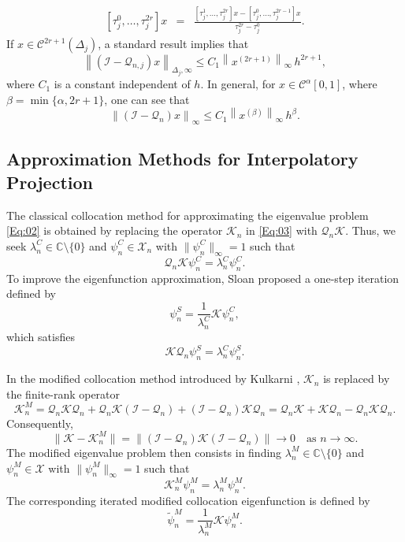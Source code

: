 \documentclass[]{interact}
\theoremstyle{plain}%
\theoremstyle{definition}
\theoremstyle{remark}
\newcommand{\norm}[1]{\left\lVert #1\right\rVert}
\begin{document}
\begin{eqnarray*}
	\left[\tau_j^0, \ldots, \tau_j^{2r}\right]x &=& \frac{\left[\tau_j^1, \ldots, \tau_j^{2r}\right]x - \left[\tau_j^0, \ldots, \tau_j^{2r-1}\right]x}{\tau_j^{2r} - \tau_j^0}.
\end{eqnarray*}
If \(x \in\mathcal{C}^{2r+1}(\Delta_j)\), a standard result implies that
\begin{equation*} 
	\norm{(\mathcal{I} - \mathcal{Q}_{n,j})x}_{\Delta_j, \infty}  \leq C_1 \norm{x^{(2r+1)}}_\infty \, h^{2r+1},
\end{equation*}
where $C_1$ is a constant independent of $h$. In general, for $x \in \mathcal{C}^{\alpha}[0,1]$, where $\beta = \min\{\alpha, 2r+1\}$, one can see that
\begin{equation}  \label{Eq:05}
	\norm{(\mathcal{I}-\mathcal{Q}_n)x}_\infty 
	\le C_1 \norm{x^{(\beta)}}_\infty \, h^{\beta}.
\end{equation}




\subsection{Approximation Methods for Interpolatory Projection}

\noindent
The classical collocation method for approximating the eigenvalue problem 
\eqref{Eq:02} is obtained by replacing the operator $\mathcal{K}_n$ in 
\eqref{Eq:03} with $\mathcal{Q}_n \mathcal{K}$. 
Thus, we seek $\lambda_n^C \in \mathbb{C}\setminus\{0\}$ and 
$\psi_n^C \in \mathcal{X}_n$ with $\|\psi_n^C\|_\infty = 1$ such that
\[
\mathcal{Q}_n \mathcal{K} \psi_n^C = \lambda_n^C \psi_n^C .
\]
To improve the eigenfunction approximation, Sloan \cite{Sloan1} proposed a 
one-step iteration defined by
\[
\psi_n^S = \frac{1}{\lambda_n^C}\mathcal{K}\psi_n^C ,
\]
which satisfies
\[
\mathcal{K}\mathcal{Q}_n \psi_n^S = \lambda_n^C \psi_n^S .
\]

\medskip
\noindent
In the modified collocation method introduced by Kulkarni \cite{RPK6}, 
$\mathcal{K}_n$ is replaced by the finite-rank operator
\[
\mathcal{K}_n^M 
= \mathcal{Q}_n \mathcal{K} \mathcal{Q}_n
+ \mathcal{Q}_n \mathcal{K}(\mathcal{I}-\mathcal{Q}_n)
+ (\mathcal{I}-\mathcal{Q}_n)\mathcal{K}\mathcal{Q}_n
= \mathcal{Q}_n \mathcal{K} + \mathcal{K}\mathcal{Q}_n 
- \mathcal{Q}_n \mathcal{K} \mathcal{Q}_n .
\]
Consequently,
\[
\|\mathcal{K}-\mathcal{K}_n^M\|
= \|(\mathcal{I}-\mathcal{Q}_n)\mathcal{K}(\mathcal{I}-\mathcal{Q}_n)\|
\to 0 \quad \text{as } n \to \infty.
\]
The modified eigenvalue problem then consists in finding 
$\lambda_n^M \in \mathbb{C}\setminus\{0\}$ and 
$\psi_n^M \in \mathcal{X}$ with $\|\psi_n^M\|_\infty = 1$ such that
\[
\mathcal{K}_n^M \psi_n^M = \lambda_n^M \psi_n^M .
\]
The corresponding iterated modified collocation eigenfunction is defined by
\[
\widetilde{\psi}_n^M 
= \frac{1}{\lambda_n^M}\mathcal{K}\psi_n^M .
\]
\end{document}
